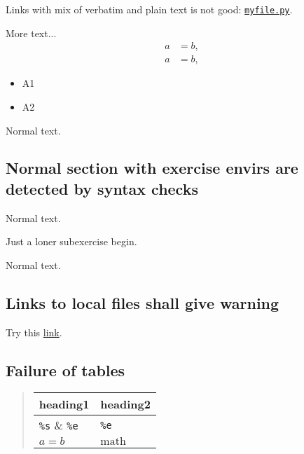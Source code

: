 \documentclass[%
oneside,                 %
final,                   %
10pt]{article}
\newcounter{doconce:movie:counter}
\begin{document}
Links with mix of verbatim and plain text is not good: \href{{https://some.where.net/myfile.py}}{\nolinkurl{myfile.py}}.

More text...
\begin{align}
a &= b,  \label{eq1}\\
a &= b,  \label{eq2}
\end{align}

\begin{itemize}
 \item A1

 \item A2
\end{itemize}

\noindent
Normal text.

\subsection{Normal section with exercise envirs are detected by syntax checks}

Normal text.

Just a loner subexercise begin.

Normal text.

\subsection{Links to local files shall give warning}

Try this \href{{_static/doconce.py}}{link}.

\subsection{Failure of tables}


\begin{quote}
\begin{tabular}{ll}
\hline
\multicolumn{1}{c}{ heading1 } & \multicolumn{1}{c}{ heading2 } \\
\hline
\Verb!%
$a=b$     & $\mbox{math}$ \\
\hline
\end{tabular}
\end{quote}

\noindent


\cleardoublepage{}  %
\printindex
\end{document}
